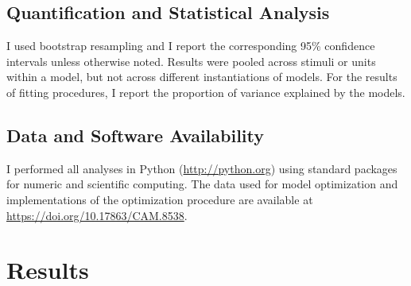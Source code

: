 \subsection*{Quantification and Statistical Analysis}
I used bootstrap resampling and I report the corresponding 95\% confidence intervals unless otherwise noted. Results were pooled across stimuli or units within a model, but not across different instantiations of models. For the results of fitting procedures, I report the proportion of variance explained by the models.

\subsection*{Data and Software Availability}
I performed all analyses in Python (\url{http://python.org}) using standard packages for numeric and scientific computing. The data used for model optimization and implementations of the optimization procedure are available at \url{https://doi.org/10.17863/CAM.8538}.


\section{Results}

